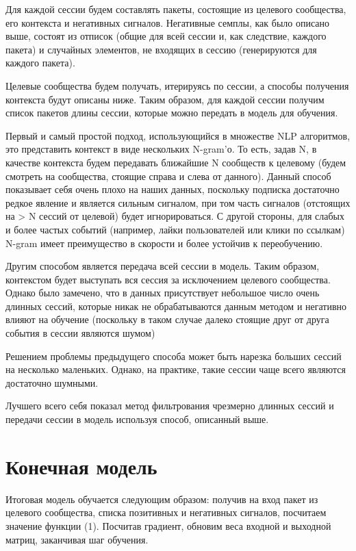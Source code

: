 \documentclass[times,specification,annotation]{itmo-student-thesis}
\begin{document}
Для каждой сессии будем составлять пакеты, состоящие из целевого
сообщества, его контекста и негативных сигналов. Негативные семплы, как было
описано выше, состоят из отписок (общие для всей сессии и, как следствие,
каждого пакета) и случайных элементов, не входящих в сессию (генерируются для
каждого пакета).

Целевые сообщества будем получать, итерируясь по сессии, а способы
получения контекста будут описаны ниже. Таким образом, для каждой сессии
получим список пакетов длины сессии, которые можно передать в модель для
обучения.

Первый и самый простой подход, использующийся в множестве NLP
алгоритмов, это представить контекст в виде нескольких N-gram’о. То есть, задав
N, в качестве контекста будем передавать ближайшие N сообществ к целевому
(будем смотреть на сообщества, стоящие справа и слева от данного). Данный
способ показывает себя очень плохо на наших данных, поскольку подписка
достаточно редкое явление и является сильным сигналом, при том часть сигналов
(отстоящих на > N сессий от целевой) будет игнорироваться. С другой стороны,
для слабых и более частых событий (например, лайки пользователей или клики по
ссылкам) N-gram имеет преимущество в скорости и более устойчив к
переобучению.

Другим способом является передача всей сессии в модель. Таким образом,
контекстом будет выступать вся сессия за исключением целевого сообщества.
Однако было замечено, что в данных присутствует небольшое число очень
длинных сессий, которые никак не обрабатываются данным методом и негативно
влияют на обучение (поскольку в таком случае далеко стоящие друг от друга
события в сессии являются шумом)

Решением проблемы предыдущего способа может быть нарезка больших
сессий на несколько маленьких. Однако, на практике, такие сессии чаще всего
являются достаточно шумными.

Лучшего всего себя показал метод фильтрования чрезмерно длинных сессий
и передачи сессии в модель используя способ, описанный выше.

\section{Конечная модель}

Итоговая модель обучается следующим образом: получив на вход пакет из
целевого сообщества, списка позитивных и негативных сигналов, посчитаем
значение функции (1). Посчитав градиент, обновим веса входной и выходной
матриц, заканчивая шаг обучения.
\end{document}
